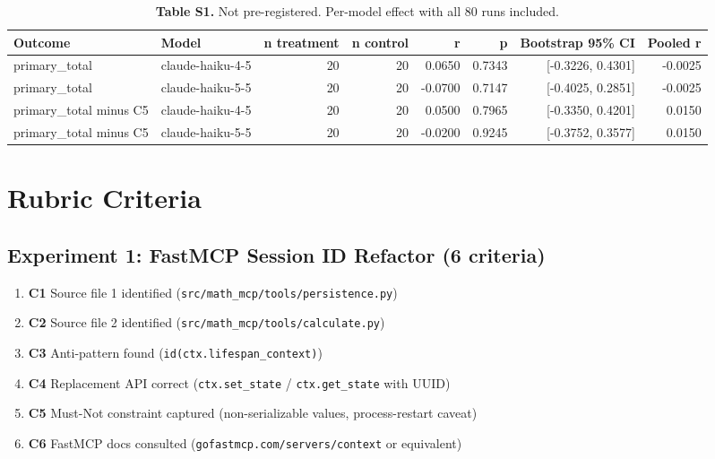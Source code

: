 \documentclass[11pt,a4paper]{article}
\begin{document}
\begin{table}[h]
\centering\small
\captionsetup{labelformat=empty}
\caption{\small \textbf{Table S1.} Not pre-registered. Per-model effect with all 80 runs included.}
\label{tab:exp5s1}
\begin{tabular}{llrrrrrr}
\toprule
Outcome & Model & n treatment & n control & r & p & Bootstrap 95\% CI & Pooled r \\
\midrule
primary\_total        & claude-haiku-4-5 & 20 & 20 & 0.0650 & 0.7343 & [-0.3226, 0.4301] & -0.0025 \\
primary\_total        & claude-haiku-5-5 & 20 & 20 & -0.0700 & 0.7147 & [-0.4025, 0.2851] & -0.0025 \\
primary\_total minus C5 & claude-haiku-4-5 & 20 & 20 & 0.0500 & 0.7965 & [-0.3350, 0.4201] & 0.0150 \\
primary\_total minus C5 & claude-haiku-5-5 & 20 & 20 & -0.0200 & 0.9245 & [-0.3752, 0.3577] & 0.0150 \\
\bottomrule
\end{tabular}
\end{table}

\section{Rubric Criteria}
\label{app:rubrics}

\subsection*{Experiment 1: FastMCP Session ID Refactor (6 criteria)}

\begin{enumerate}
  \item \textbf{C1} Source file 1 identified (\texttt{src/math\_mcp/tools/persistence.py})
  \item \textbf{C2} Source file 2 identified (\texttt{src/math\_mcp/tools/calculate.py})
  \item \textbf{C3} Anti-pattern found (\texttt{id(ctx.lifespan\_context)})
  \item \textbf{C4} Replacement API correct (\texttt{ctx.set\_state} / \texttt{ctx.get\_state}
        with UUID)
  \item \textbf{C5} Must-Not constraint captured (non-serializable values, process-restart
        caveat)
  \item \textbf{C6} FastMCP docs consulted (\texttt{gofastmcp.com/servers/context} or
        equivalent)
\end{enumerate}
\end{document}
